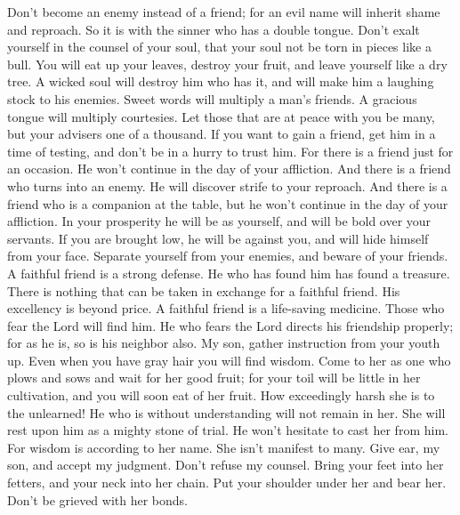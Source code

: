  Don't become an enemy instead of a friend; for an evil name
will inherit shame and reproach. So it is with the sinner who has a
double tongue.  Don't exalt yourself in the counsel of your
soul, that your soul not be torn in pieces like a bull.  You
will eat up your leaves, destroy your fruit, and leave yourself like a
dry tree.  A wicked soul will destroy him who has it, and
will make him a laughing stock to his enemies.  Sweet words
will multiply a man's friends. A gracious tongue will multiply
courtesies.  Let those that are at peace with you be many,
but your advisers one of a thousand.  If you want to gain a
friend, get him in a time of testing, and don't be in a hurry to trust
him.  For there is a friend just for an occasion. He won't
continue in the day of your affliction.  And there is a
friend who turns into an enemy. He will discover strife to your
reproach.  And there is a friend who is a companion at the
table, but he won't continue in the day of your affliction.
 In your prosperity he will be as yourself, and will be
bold over your servants.  If you are brought low, he will
be against you, and will hide himself from your face. 
Separate yourself from your enemies, and beware of your friends.
 A faithful friend is a strong defense. He who has found
him has found a treasure.  There is nothing that can be
taken in exchange for a faithful friend. His excellency is beyond price.
 A faithful friend is a life-saving medicine. Those who
fear the Lord will find him.  He who fears the Lord directs
his friendship properly; for as he is, so is his neighbor also.
 My son, gather instruction from your youth up. Even when
you have gray hair you will find wisdom.  Come to her as
one who plows and sows and wait for her good fruit; for your toil will
be little in her cultivation, and you will soon eat of her fruit.
 How exceedingly harsh she is to the unlearned! He who is
without understanding will not remain in her.  She will
rest upon him as a mighty stone of trial. He won't hesitate to cast her
from him.  For wisdom is according to her name. She isn't
manifest to many.  Give ear, my son, and accept my
judgment. Don't refuse my counsel.  Bring your feet into
her fetters, and your neck into her chain.  Put your
shoulder under her and bear her. Don't be grieved with her bonds.
